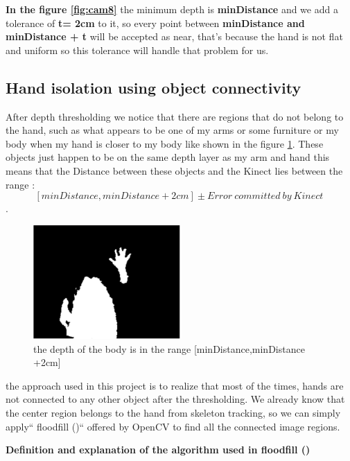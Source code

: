 \textbf{In the figure \ref{fig:cam8}} the minimum depth is \textbf{minDistance} and we add a tolerance of\textbf{  t= 2cm }to it, so every point between \textbf{minDistance and minDistance + t }  will be accepted as near, that's because the hand is not flat and uniform so this tolerance will handle that problem for us.


\subsection{Hand isolation using object connectivity }

After depth thresholding we notice that there are regions that do not belong to the hand, such as what appears to be one of my  arms or some furniture or my body when my hand is closer to my body like shown in the figure  \ref{fig:cam10}. These objects just happen to be on the same depth layer as my arm and hand this means that the Distance between these objects and the Kinect lies  between the range : $$[minDistance,minDistance +2cm] \pm {Error\ committed\ by\ Kinect\ } $$.


\begin{figure}[H]
\centering
\includegraphics[width=0.5\textwidth]{img/depththresholding.png}
\caption{the depth of the body is in  the range [minDistance,minDistance +2cm]}
\label{fig:cam10}
\end{figure}

the approach used in this project  is to realize that most of the times, hands are not connected to any other object after the thresholding. We already know that the center region belongs to the hand from skeleton tracking, so we can simply apply`` floodfill ()`` offered by OpenCV to find all the connected image regions.

\textbf{ Definition and explanation of the algorithm used in floodfill () }

